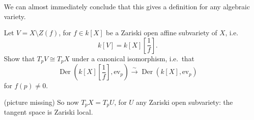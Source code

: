 \documentclass{article}
\DeclareMathOperator{\Der}{Der}
\begin{document}
We can almost immediately conclude that this gives a definition for any algebraic variety.
\begin{ex}
    Let $V = X \setminus Z(f)$, for $f \in k[X]$ be a Zariski open affine subvariety of $X$, i.e.\
    \begin{equation*}
        k[V] = k[X]\left[\frac{1}{f}\right].
    \end{equation*}
    Show that $T_p V \cong T_p X$ under a canonical isomorphism, i.e.\ that
    \begin{equation*}\Der\left(k[X]\left[\frac{1}{f}\right], \text{ev}_p\right) \xrightarrow{\sim} \Der(k[X], \text{ev}_p)\end{equation*}
    for $f(p) \neq 0$.
\end{ex}
(picture missing)
So now $T_p X = T_p U$, for $U$ any Zariski open subvariety: the tangent space is Zariski local.
\end{document}

